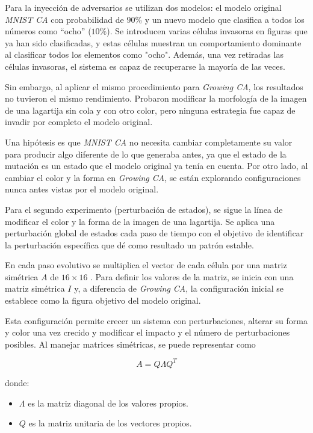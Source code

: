 Para la inyección de adversarios se utilizan dos modelos: el modelo original \textit{MNIST CA} con probabilidad de $90\%$ y un nuevo modelo que clasifica a todos los números como ``ocho'' ($10\%$).  Se introducen varias células invasoras en figuras que ya han sido clasificadas, y estas células muestran un comportamiento dominante al clasificar todos los elementos como "ocho". Además, una vez retiradas las células invasoras, el sistema es capaz de recuperarse la mayoría de las veces.

Sin embargo, al aplicar el mismo procedimiento para \textit{Growing CA}, los resultados no tuvieron el mismo rendimiento. Probaron modificar la morfología de la imagen de una lagartija sin cola y con otro color, pero ninguna estrategia fue capaz de invadir por completo el modelo original. 

Una hipótesis es que \textit{MNIST CA} no necesita cambiar completamente su valor para producir algo diferente de lo que generaba antes, ya que el estado de la mutación es un estado que el modelo original ya tenía en cuenta. Por otro lado, al cambiar el color y la forma en \textit{Growing CA}, se están explorando configuraciones nunca antes vistas por el modelo original.

Para el segundo experimento (perturbación de estados), se sigue la línea de modificar el color y la forma de la imagen de una lagartija. Se aplica una perturbación global de estados cada paso de tiempo con el objetivo de identificar la perturbación específica que dé como resultado un patrón estable.

En cada paso evolutivo se multiplica el vector de cada célula por una matriz simétrica $A$ de $16 \times 16$ \cite{mordvintsevNCA}. Para definir los valores de la matriz, se inicia con una matriz simétrica $I$ y, a diferencia de \textit{Growing CA}, la configuración inicial se establece como la figura objetivo del modelo original.

Esta configuración permite crecer un sistema con perturbaciones, alterar su forma y color una vez crecido y modificar el impacto y el número de perturbaciones posibles. Al manejar matrices simétricas, se puede representar como 

\[A = Q \Lambda Q^T\] 

donde: 

\begin{itemize}
	
	\item $\Lambda$ es la matriz diagonal de los valores propios.
	
	\item $Q$ es la matriz unitaria de los vectores propios.
	
\end{itemize} 

